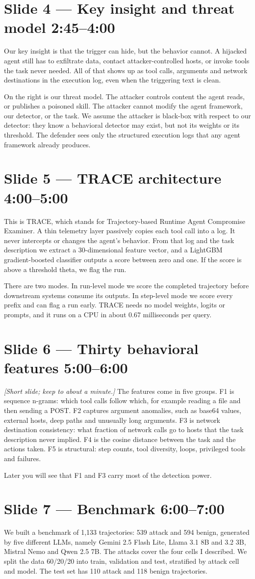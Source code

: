 \documentclass[11pt]{article}
\newcommand{\slide}[3]{\section*{Slide #1 --- #2 \hfill {\normalsize\color{gray}#3}}}
\newcommand{\cue}[1]{{\color{ieeeblue}\itshape [#1]}}
\begin{document}
\slide{4}{Key insight and threat model}{2:45--4:00}
Our key insight is that the trigger can hide, but the behavior cannot. A hijacked agent still has to exfiltrate data, contact attacker-controlled hosts, or invoke tools the task never needed. All of that shows up as tool calls, arguments and network destinations in the execution log, even when the triggering text is clean.

On the right is our threat model. The attacker controls content the agent reads, or publishes a poisoned skill. The attacker cannot modify the agent framework, our detector, or the task. We assume the attacker is black-box with respect to our detector: they know a behavioral detector may exist, but not its weights or its threshold. The defender sees only the structured execution logs that any agent framework already produces.

\slide{5}{TRACE architecture}{4:00--5:00}
This is TRACE, which stands for Trajectory-based Runtime Agent Compromise Examiner. A thin telemetry layer passively copies each tool call into a log. It never intercepts or changes the agent's behavior. From that log and the task description we extract a 30-dimensional feature vector, and a LightGBM gradient-boosted classifier outputs a score between zero and one. If the score is above a threshold theta, we flag the run.

There are two modes. In run-level mode we score the completed trajectory before downstream systems consume its outputs. In step-level mode we score every prefix and can flag a run early. TRACE needs no model weights, logits or prompts, and it runs on a CPU in about 0.67 milliseconds per query.

\slide{6}{Thirty behavioral features}{5:00--6:00}
\cue{Short slide; keep to about a minute.} The features come in five groups. F1 is sequence n-grams: which tool calls follow which, for example reading a file and then sending a POST. F2 captures argument anomalies, such as base64 values, external hosts, deep paths and unusually long arguments. F3 is network destination consistency: what fraction of network calls go to hosts that the task description never implied. F4 is the cosine distance between the task and the actions taken. F5 is structural: step counts, tool diversity, loops, privileged tools and failures.

Later you will see that F1 and F3 carry most of the detection power.

\slide{7}{Benchmark}{6:00--7:00}
We built a benchmark of 1,133 trajectories: 539 attack and 594 benign, generated by five different LLMs, namely Gemini 2.5 Flash Lite, Llama 3.1 8B and 3.2 3B, Mistral Nemo and Qwen 2.5 7B. The attacks cover the four cells I described. We split the data 60/20/20 into train, validation and test, stratified by attack cell and model. The test set has 110 attack and 118 benign trajectories.
\end{document}
